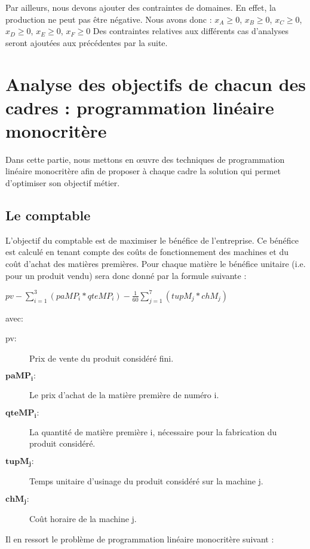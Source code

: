 \documentclass[12pt]{article}
\begin{document}
Par ailleurs, nous devons ajouter des contraintes de domaines. En effet, la production ne peut pas être négative. Nous avons donc :
$ x_{A} \geq 0$, $x_{B}  \geq 0$, $x_{C} \geq 0$, $x_{D} \geq 0$, $x_{E} \geq 0$, $x_{F} \geq 0 $
Des contraintes relatives aux différents cas d'analyses seront ajoutées aux précédentes par la suite.
\section{Analyse des objectifs de chacun des cadres : programmation linéaire monocritère}
Dans cette partie, nous mettons en œuvre des techniques de programmation linéaire monocritère afin de proposer à chaque cadre la solution qui permet d'optimiser son objectif métier.
\subsection{Le comptable}
L'objectif du comptable est de maximiser le bénéfice de l'entreprise. Ce bénéfice est calculé en tenant compte des coûts de fonctionnement des machines et du coût d'achat des matières premières. Pour chaque matière le bénéfice unitaire (i.e. pour un produit vendu) sera donc donné par la formule suivante : \begin{center} $pv - \sum_{i=1}^{3}(paMP_{i} * qteMP_{i}) - \frac{1}{60} \sum_{j=1}^{7}(tupM_{j} * chM_{j}) $ \end{center} avec: \newline 
\begin{description}
\item[pv: ]Prix de vente du produit considéré fini.
\item[$\mathbf{paMP_{i} :}$] Le prix d'achat de la matière première de numéro i.
\item[$\mathbf{qteMP_{i} :}$] La quantité de matière première i, nécessaire pour la fabrication du produit considéré.
\item[$\mathbf{tupM_{j} :}$] Temps unitaire d'usinage du produit considéré sur la machine j.
\item[$\mathbf{chM_{j} :}$] Coût horaire de la machine j.
\end{description}
Il en ressort le problème de programmation linéaire monocritère suivant : \newline 
\\
\noindent{}
\end{document}
